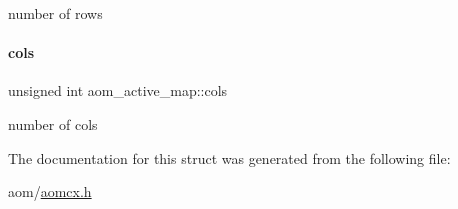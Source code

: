 number of rows \mbox{\label{structaom__active__map_a3a105e0d8f2643cdc542e2f078b9e6b2}} 
\paragraph{\texorpdfstring{cols}{cols}}
{\footnotesize\ttfamily unsigned int aom\+\_\+active\+\_\+map\+::cols}

number of cols 

The documentation for this struct was generated from the following file\+:\begin{DoxyCompactItemize}
\item 
aom/\hyperlink{aomcx_8h}{aomcx.\+h}\end{DoxyCompactItemize}
